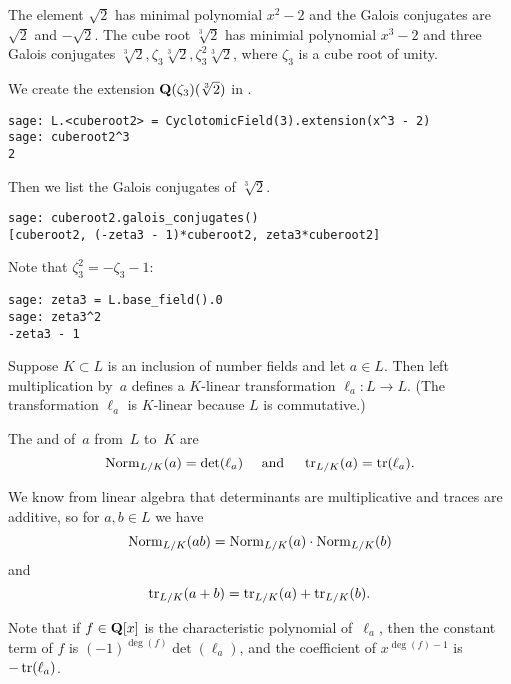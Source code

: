 \begin{example}
The element $\sqrt{2}$ has minimal polynomial $x^2-2$ and the Galois
conjugates are $\sqrt{2}$ and $-\sqrt{2}$.  The cube root $\sqrt[3]{2}$
has minimial polynomial $x^3 - 2$ and three Galois conjugates 
$\sqrt[3]{2}, \zeta_3\sqrt[3]{2}, \zeta_3^2\sqrt[3]{2}$, where
$\zeta_3$ is a cube root of unity. 

We create the extension $\mathbf{Q}(\zeta_3)(\sqrt[3]{2})$ in \sage.
\begin{verbatim}
sage: L.<cuberoot2> = CyclotomicField(3).extension(x^3 - 2)
sage: cuberoot2^3
2
\end{verbatim}%

\noindent Then we list the Galois conjugates of $\sqrt[3]{2}$. 
\begin{verbatim}
sage: cuberoot2.galois_conjugates()
[cuberoot2, (-zeta3 - 1)*cuberoot2, zeta3*cuberoot2]
\end{verbatim}%

\noindent Note that $\zeta_3^2 = -\zeta_3 - 1$:

\begin{verbatim}
sage: zeta3 = L.base_field().0
sage: zeta3^2
-zeta3 - 1
\end{verbatim}
\end{example}

Suppose $K\subset L$ is an inclusion of number fields and let $a\in
L$.  Then left multiplication by~$a$ defines a $K$-linear
transformation $\ell_a:L\to L$.  (The transformation $\ell_a$ is
$K$-linear because $L$ is commutative.)

\begin{definition}
The  and  of~$a$ from~$L$ to~$K$ are
$$\operatorname{Norm}_{L/K}(a)=\det(\ell_a) \quad\text{ and }\quad
 \operatorname{tr}_{L/K}(a)=\operatorname{tr}(\ell_a).$$
\end{definition}
We know from linear algebra that 
determinants are multiplicative
and traces are additive, so for $a,b\in L$ we have
$$\operatorname{Norm}_{L/K}(ab) = \operatorname{Norm}_{L/K}(a)\cdot \operatorname{Norm}_{L/K}(b)$$
and
$$\operatorname{tr}_{L/K}(a+b) = \operatorname{tr}_{L/K}(a) + \operatorname{tr}_{L/K}(b).$$

Note that if $f\in\mathbf{Q}[x]$ is the characteristic polynomial of~$\ell_a$,
then the constant term of $f$ is $(-1)^{\deg(f)}\det(\ell_a)$, and the
coefficient of $x^{\deg(f)-1}$ is $-\operatorname{tr}(\ell_a)$.

